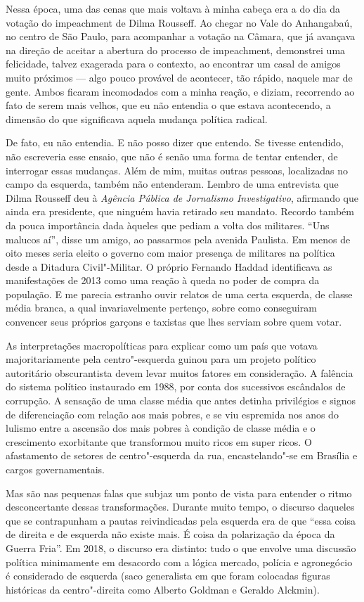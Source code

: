 Nessa época, uma das cenas que mais voltava à minha cabeça era a do dia
da votação do impeachment de Dilma Rousseff. Ao chegar no Vale do
Anhangabaú, no centro de São Paulo, para acompanhar a votação na Câmara,
que já avançava na direção de aceitar a abertura do processo de
impeachment, demonstrei uma felicidade, talvez exagerada para o contexto,
ao encontrar um casal de amigos muito próximos --- algo pouco provável de
acontecer, tão rápido, naquele mar de gente. Ambos ficaram incomodados
com a minha reação, e diziam, recorrendo ao fato de serem mais velhos,
que eu não entendia o que estava acontecendo, a dimensão do que
significava aquela mudança política radical.

De fato, eu não entendia. E não posso dizer que entendo. Se tivesse
entendido, não escreveria esse ensaio, que não é senão uma forma de
tentar entender, de interrogar essas mudanças. Além de mim, muitas
outras pessoas, localizadas no campo da esquerda, também não entenderam.
Lembro de uma entrevista que Dilma Rousseff deu à \emph{Agência Pública de Jornalismo Investigativo}, afirmando que ainda era presidente, que ninguém havia
retirado seu mandato. Recordo também da pouca importância dada àqueles
que pediam a volta dos militares. ``Uns malucos aí'', disse um
amigo, ao passarmos pela avenida Paulista. Em menos de oito meses seria eleito o
governo com maior presença de militares na política desde a Ditadura
Civil"-Militar. O próprio Fernando Haddad identificava as manifestações de 2013
como uma reação à queda no poder de compra da população. E me parecia
estranho ouvir relatos de uma certa esquerda, de classe média branca, a qual invariavelmente pertenço,
sobre como conseguiram convencer seus próprios garçons e taxistas que
lhes serviam sobre quem votar.

As interpretações macropolíticas para explicar como um país que votava
majoritariamente pela centro"-esquerda guinou para um projeto político
autoritário obscurantista devem levar muitos fatores em consideração. A
falência do sistema político instaurado em 1988, por conta dos
sucessivos escândalos de corrupção. A sensação de uma classe média que
antes detinha privilégios e signos de diferenciação com relação aos mais
pobres, e se viu espremida nos anos do lulismo entre a ascensão dos mais
pobres à condição de classe média e o crescimento exorbitante que
transformou muito ricos em super ricos. O afastamento de setores de
centro"-esquerda da rua, encastelando"-se em Brasília e cargos
governamentais.

Mas são nas pequenas falas que subjaz um ponto de vista para entender o
ritmo desconcertante dessas transformações. Durante muito tempo, o
discurso daqueles que se contrapunham a pautas reivindicadas pela
esquerda era de que ``essa coisa de direita e de esquerda não existe
mais. É coisa da polarização da época da Guerra Fria''. Em 2018, o
discurso era distinto: tudo o que envolve uma discussão política
minimamente em desacordo com a lógica mercado, polícia e agronegócio é
considerado de esquerda (saco generalista em que foram colocadas figuras
históricas da centro"-direita como Alberto Goldman e Geraldo Alckmin).

